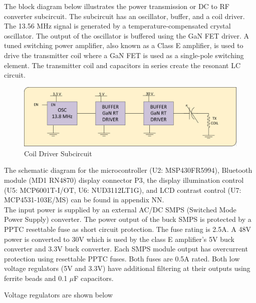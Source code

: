 \documentclass[12pt]{article}
\begin{document}
\hfill

\pagebreak

\indent
The block diagram below illustrates the power transmission or DC to RF converter subcircuit.  The subcircuit has an oscillator, buffer, and a coil driver.  The 13.56 MHz signal is generated by a temperature-compensated crystal oscillator. The output of the oscillator is buffered using the GaN FET driver. A tuned switching power amplifier, also known as a Class E amplifier, is used to drive the transmitter coil where a GaN FET is used as a single-pole switching element. The transmitter coil and capacitors in series create the resonant LC circuit.\\

\hfill

\begin{figure}[h!]
\centering
\includegraphics[width=0.88\linewidth]{trans_coil}
\caption{Coil Driver Subcircuit}
\end{figure}

\hfill

\indent
The schematic diagram for the microcontroller (U2: MSP430FR5994), Bluetooth module (MD1 RN4870) display connector P3, the display illumination control (U5: MCP6001T-I/OT, U6: NUD3112LT1G), and LCD contrast control (U7: MCP4531-103E/MS) can be found in appendix NN.\\

\indent
The input power is supplied by an external AC/DC SMPS (Switched Mode Power Supply) converter. The power output of the buck SMPS is protected by a PPTC resettable fuse as short circuit protection. The fuse rating is 2.5A. A 48V power is converted to 30V which is used by the class E amplifier’s 5V buck converter and 3.3V buck converter. Each SMPS module output has overcurrent protection using resettable PPTC fuses. Both fuses are 0.5A rated.
Both low voltage regulators (5V and 3.3V) have additional filtering at their outputs using ferrite beads and 0.1 $\mu$F capacitors.

\pagebreak

\indent
Voltage regulators are shown below

\hfill
\end{document}
